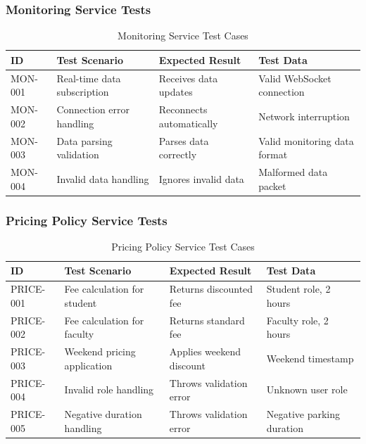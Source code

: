 \subsubsection{Monitoring Service Tests}
\begin{table}[H]
\centering
\small
\renewcommand{\arraystretch}{1.3}
\begin{tabularx}{\textwidth}{|l|>{\RaggedRight\arraybackslash}X|>{\RaggedRight\arraybackslash}X|>{\RaggedRight\arraybackslash}p{3.5cm}|}
\hline
\textbf{ID} & \textbf{Test Scenario} & \textbf{Expected Result} & \textbf{Test Data} \\
\hline
MON-001 & Real-time data subscription & Receives data updates & Valid WebSocket connection \\
\hline
MON-002 & Connection error handling & Reconnects automatically & Network interruption \\
\hline
MON-003 & Data parsing validation & Parses data correctly & Valid monitoring data format \\
\hline
MON-004 & Invalid data handling & Ignores invalid data & Malformed data packet \\
\hline
\end{tabularx}
\caption{Monitoring Service Test Cases}
\label{tab:monitoring-service-tests}
\end{table}

\subsubsection{Pricing Policy Service Tests}
\begin{table}[H]
\centering
\small
\renewcommand{\arraystretch}{1.3}
\begin{tabularx}{\textwidth}{|l|>{\RaggedRight\arraybackslash}X|>{\RaggedRight\arraybackslash}X|>{\RaggedRight\arraybackslash}p{3.5cm}|}
\hline
\textbf{ID} & \textbf{Test Scenario} & \textbf{Expected Result} & \textbf{Test Data} \\
\hline
PRICE-001 & Fee calculation for student & Returns discounted fee & Student role, 2 hours \\
\hline
PRICE-002 & Fee calculation for faculty & Returns standard fee & Faculty role, 2 hours \\
\hline
PRICE-003 & Weekend pricing application & Applies weekend discount & Weekend timestamp \\
\hline
PRICE-004 & Invalid role handling & Throws validation error & Unknown user role \\
\hline
PRICE-005 & Negative duration handling & Throws validation error & Negative parking duration \\
\hline
\end{tabularx}
\caption{Pricing Policy Service Test Cases}
\label{tab:pricing-policy-service-tests}
\end{table}

